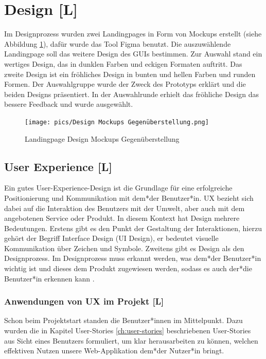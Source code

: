 \section{Design [L]}
Im Designprozess wurden zwei Landingpages in Form von Mockups erstellt (siehe Abbildung \ref{fig:impl:design:mokupsvs}), dafür wurde das Tool Figma benutzt. Die auszuwählende Landingpage soll das weitere Design des GUIs bestimmen.
Zur Auswahl stand ein wertiges Design, das in dunklen Farben und eckigen Formaten auftritt.
Das zweite Design ist ein fröhliches Design in bunten und hellen Farben und runden Formen.
Der Auswahlgruppe wurde der Zweck des Prototyps erklärt und die beiden Designs präsentiert.
In der Auswahlrunde erhielt das fröhliche Design das bessere Feedback und wurde ausgewählt.

\begin{figure}[h t]
    \centering
    \texttt{[image: pics/Design Mockups Gegenüberstellung.png]}
    \caption{Landingpage Design Mockups Gegenüberstellung}
    \label{fig:impl:design:mokupsvs}
\end{figure}


\subsection{User Experience [L]}
Ein gutes User-Experience-Design ist die Grundlage für eine erfolgreiche Positionierung und Kommunikation mit dem*der Benutzer*in.
UX bezieht sich dabei auf die Interaktion des Benutzers mit der Umwelt, aber auch mit dem angebotenen Service oder Produkt. In diesem Kontext hat Design mehrere Bedeutungen.
Erstens gibt es den Punkt der Gestaltung der Interaktionen, hierzu gehört der Begriff Interface Design (UI Design), er bedeutet visuelle Kommunikation über Zeichen und Symbole.
Zweitens gibt es Design als den Designprozess. Im Designprozess muss erkannt werden, was dem*der Benutzer*in wichtig ist und dieses dem Produkt zugewiesen werden, sodass es auch der*die Benutzer*in erkennen kann \cite{UserExperienceDesign}.

\subsubsection{Anwendungen von UX im Projekt [L]}
Schon beim Projektstart standen die Benutzer*innen im Mittelpunkt. Dazu wurden die in Kapitel User-Stories \ref{ch:user-stories} beschriebenen User-Stories aus Sicht eines Benutzers formuliert, um klar herausarbeiten zu können, welchen effektiven Nutzen unsere Web-Applikation dem*der Nutzer*in bringt.

